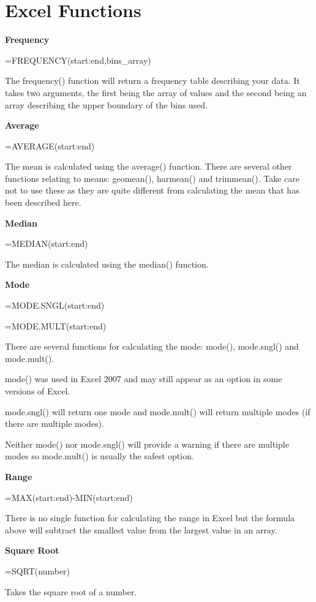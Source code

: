 \documentclass[
]{book}
\begin{document}
\hypertarget{excel-functions}{%
\section*{Excel Functions}\label{excel-functions}}

\textbf{Frequency}

=FREQUENCY(start:end,bins\_array)

The frequency() function will return a frequency table describing your data. It takes two arguments, the first being the array of values and the second being an array describing the upper boundary of the bins used.

\textbf{Average}

=AVERAGE(start:end)

The mean is calculated using the average() function. There are several other functions relating to means: geomean(), harmean() and trimmean(). Take care not to use these as they are quite different from calculating the mean that has been described here.

\textbf{Median}

=MEDIAN(start:end)

The median is calculated using the median() function.

\textbf{Mode}

=MODE.SNGL(start:end)

=MODE.MULT(start:end)

There are several functions for calculating the mode: mode(), mode.sngl() and mode.mult().

mode() was used in Excel 2007 and may still appear as an option in some versions of Excel.

mode.sngl() will return one mode and mode.mult() will return multiple modes (if there are multiple modes).

Neither mode() nor mode.sngl() will provide a warning if there are multiple modes so mode.mult() is usually the safest option.

\textbf{Range}

=MAX(start:end)-MIN(start:end)

There is no single function for calculating the range in Excel but the formula above will subtract the smallest value from the largest value in an array.

\textbf{Square Root}

=SQRT(number)

Takes the square root of a number.
\end{document}
